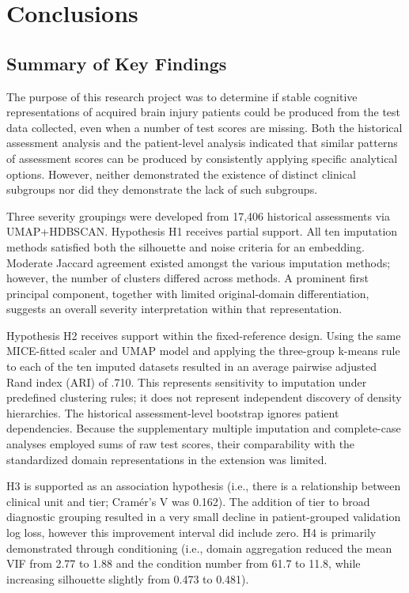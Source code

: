 \chapter{Conclusions}\label{Chapter7}

\section{Summary of Key Findings}

The purpose of this research project was to determine if stable cognitive representations of acquired brain injury patients could be produced from the test data collected, even when a number of test scores are missing. Both the historical assessment analysis and the patient-level analysis indicated that similar patterns of assessment scores can be produced by consistently applying specific analytical options. However, neither demonstrated the existence of distinct clinical subgroups nor did they demonstrate the lack of such subgroups.

Three severity groupings were developed from 17,406 historical assessments via UMAP+HDBSCAN. Hypothesis H1 receives partial support. All ten imputation methods satisfied both the silhouette and noise criteria for an embedding. Moderate Jaccard agreement existed amongst the various imputation methods; however, the number of clusters differed across methods. A prominent first principal component, together with limited original-domain differentiation, suggests an overall severity interpretation within that representation.

Hypothesis H2 receives support within the fixed-reference design. Using the same MICE-fitted scaler and UMAP model and applying the three-group k-means rule to each of the ten imputed datasets resulted in an average pairwise adjusted Rand index (ARI) of .710. This represents sensitivity to imputation under predefined clustering rules; it does not represent independent discovery of density hierarchies. The historical assessment-level bootstrap ignores patient dependencies. Because the supplementary multiple imputation and complete-case analyses employed sums of raw test scores, their comparability with the standardized domain representations in the extension was limited.

H3 is supported as an association hypothesis (i.e., there is a relationship between clinical unit and tier; Cramér's V was 0.162). The addition of tier to broad diagnostic grouping resulted in a very small decline in patient-grouped validation log loss, however this improvement interval did include zero. H4 is primarily demonstrated through conditioning (i.e., domain aggregation reduced the mean VIF from 2.77 to 1.88 and the condition number from 61.7 to 11.8, while increasing silhouette slightly from 0.473 to 0.481).

